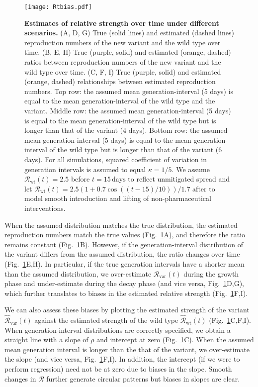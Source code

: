 \documentclass[12pt]{article}
\newcommand{\fref}[1]{Fig.~\ref{fig:#1}}
\newcommand{\vvvar}{\mathrm{var}}
\newcommand{\wwwt}{\mathrm{wt}}
\newcommand{\Rx}[1]{\ensuremath{{\mathcal R}_{#1}}\xspace}
\newcommand{\RR}{\ensuremath{{\mathcal R}}\xspace}
\newcommand{\Rw}{\Rx{\wwwt}}
\newcommand{\Rv}{\Rx{\vvvar}}
\begin{document}
\begin{figure}[!th]
\texttt{[image: Rtbias.pdf]}
\caption{
\textbf{Estimates of relative strength over time under different scenarios.}
(A, D, G) True (solid lines) and estimated (dashed lines) reproduction numbers of the new variant and the wild type over time.
(B, E, H) True (purple, solid) and estimated (orange, dashed) ratios between reproduction numbers of the new variant and the wild type over time.
(C, F, I) True (purple, solid) and estimated (orange, dashed) relationships between estimated reproduction numbers.
Top row: the assumed mean generation-interval (5 days) is equal to the mean generation-interval of the wild type and the variant.
Middle row: the assumed mean generation-interval (5 days) is equal to the mean generation-interval of the wild type but is longer than that of the variant (4 days).
Bottom row: the assumed mean generation-interval (5 days) is equal to the mean generation-interval of the wild type but is longer than that of the variant (6 days).
For all simulations, squared coefficient of variation in generation intervals is assumed to equal $\kappa = 1/5$.
We assume $\Rw(t)=2.5$ before $t=15\,\textrm{days}$ to reflect unmitigated spread and let $\Rw(t)=2.5 (1+0.7\cos((t-15)/10))/1.7$ after to model smooth introduction and lifting of non-pharmaceutical interventions.
}
\label{fig:Rtbias}
\end{figure}

When the assumed distribution matches the true distribution, the estimated reproduction numbers match the true values (\fref{Rtbias}A), and therefore the ratio remains constant (\fref{Rtbias}B).
However, if the generation-interval distribution of the variant differs from the assumed distribution, the ratio changes over time (\fref{Rtbias}E,H).
In particular, if the true generation intervals have a shorter mean than the assumed distribution, we over-estimate $\Rv(t)$ during the growth phase and under-estimate during the decay phase (and vice versa, \fref{Rtbias}D,G), which further translates to biases in the estimated relative strength (\fref{Rtbias}F,I).

We can also assess these biases by plotting the estimated strength of the variant $\hat{\RR}_{\textrm{var}}(t)$ against the estimated strength of the wild type $\hat{\RR}_{\textrm{wt}}(t)$ (\fref{Rtbias}C,F,I).
When generation-interval distributions are correctly specified, we obtain a straight line with a slope of $\rho$ and intercept at zero (\fref{Rtbias}C).
When the assumed mean generation interval is longer than the that of the variant, we over-estimate the slope (and vice versa, \fref{Rtbias}F,I).
In addition, the intercept (if we were to perform regression) need not be at zero due to biases in the slope.
Smooth changes in $\RR$ further generate circular patterns but biases in slopes are clear.
\end{document}

